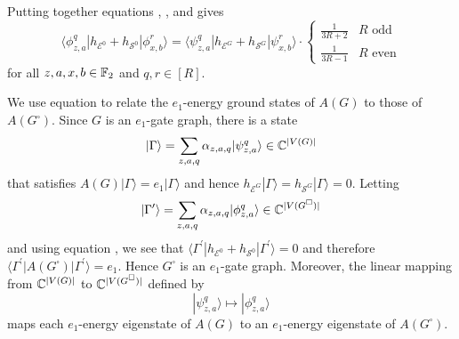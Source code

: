 \documentclass[../thesis-main/thesis-main]{subfiles}
\begin{document}
Putting together equations , , and  gives
\begin{equation}
  \langle\phi_{z,a}^{q}|h_{\mathcal{E}^{0}}+h_{\mathcal{S}^{0}}|\phi_{x,b}^{r}\rangle=\langle\psi_{z,a}^{q}|h_{\mathcal{E}^{G}}+h_{\mathcal{S}^{G}}|\psi_{x,b}^{r}\rangle\cdot
  \begin{cases}
    \frac{1}{3R+2} & R\text{ odd}\\
    \frac{1}{3R-1} & R\text{ even}
  \end{cases}
  \label{eq:h_eG_hsG}
\end{equation}
for all $z,a,x,b\in\mathbb{F}_2$ and $q,r\in[R]$. 

We use equation  to relate the $e_1$-energy ground states of $A(G)$ to those of $A(G^\square)$. Since $G$ is an $e_{1}$-gate graph, there is a state 
\begin{equation}
  |\Gamma\rangle=\sum_{z,a,q}\alpha_{z,a,q}|\psi_{z,a}^{q}\rangle\in\mathbb{C}^{|V(G)|}
\end{equation}
that satisfies $A(G)|\Gamma\rangle=e_1|\Gamma\rangle$ and hence $h_{\mathcal{E}^{G}}|\Gamma\rangle=h_{\mathcal{S}^{G}}|\Gamma\rangle=0$. Letting
\begin{equation}
  |\Gamma^{\prime}\rangle=\sum_{z,a,q}\alpha_{z,a,q}|\phi_{z,a}^{q}\rangle\in\mathbb{C}^{|V(G^\square)|}
\end{equation}
and using equation , we see that $\langle\Gamma^{\prime}|h_{\mathcal{E}^{0}}+h_{\mathcal{S}^{0}}|\Gamma^{\prime}\rangle=0$ and therefore $\langle\Gamma^{\prime}|A(G^{\square})|\Gamma^{\prime}\rangle=e_{1}$. Hence $G^{\square}$ is an $e_{1}$-gate graph. Moreover, the linear mapping from $\mathbb{C}^{|V(G)|}$ to $\mathbb{C}^{|V(G^\square)|}$ defined by
\begin{equation}
  |\psi_{z,a}^{q}\rangle \mapsto |\phi_{z,a}^{q}\rangle\label{eq:map_1particle}
\end{equation}
maps each $e_{1}$-energy eigenstate of $A(G)$ to an $e_{1}$-energy eigenstate of $A(G^{\square})$.
\end{document}
